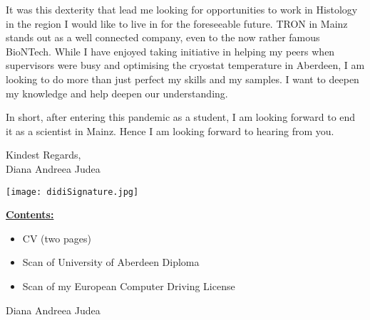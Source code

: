 \documentclass[paper=a4,fontsize=11pt]{scrartcl} %
\newcommand{\sepspace}{\vspace*{1em}}		%
\newcommand{\MyName}[1]{ %
  \Huge \usefont{OT1}{phv}{b}{n} \hfill \textcolor{titleColor}{#1}
  \par \normalsize \normalfont}
\newcommand{\MySlogan}[1]{ %
		\large \usefont{OT1}{phv}{m}{n}\hfill \textit{#1}
		\par \normalsize \normalfont}
\newcommand{\NewPart}[1]{\section*{\uppercase{{#1}}}}
\begin{document}
  \sepspace 
  \noindent It was this dexterity that lead me looking for opportunities to
  work in Histology in the region I would like to live in for the foreseeable
  future.  TRON in Mainz stands out as a well connected company, even to the
  now rather famous BioNTech.  While I have enjoyed taking initiative in
  helping my peers when supervisors were busy and optimising the cryostat
  temperature in Aberdeen, I am looking to do more than just perfect my skills
  and my samples. I want to deepen my knowledge and help deepen our
  understanding.  

  \sepspace

  \noindent In short, after entering this pandemic as a student, I am looking
  forward to end it as a scientist in Mainz.  Hence I am looking forward to
  hearing from you.
  \sepspace

  \noindent
  Kindest Regards,\\
  Diana Andreea Judea 

  \vspace{3pt}
  \texttt{[image: didiSignature.jpg]}\hspace{2.5cm}

  \vspace*{\fill}
  
  \textbf{\underline{Contents:}}
  \footnotesize
  \begin{itemize}[noitemsep,topsep=0pt]
    \setlength\itemsep{1pt}
  \item CV (two pages)
    \item Scan of University of Aberdeen Diploma
    \item Scan of my European Computer Driving License
  \end{itemize}
  \normalsize
  
  \cleardoublepage
  
  \cleardoublepage
  


  \MyName{Diana Andreea Judea}

  \sepspace
\end{document}
